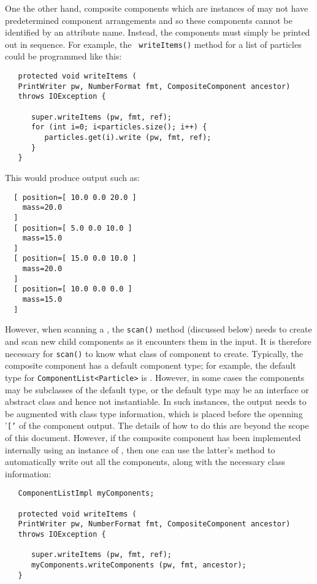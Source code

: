 \documentclass{article}
\begin{document}
One the other hand, composite components which are instances of
 may
not have predetermined component arrangements and so these components
cannot be identified by an attribute name. Instead, the components
must simply be printed out in sequence.  For example, the {\tt
writeItems()} method for a list of particles could be programmed like
this:
\begin{lstlisting}
   protected void writeItems (
   PrintWriter pw, NumberFormat fmt, CompositeComponent ancestor) 
   throws IOException {

      super.writeItems (pw, fmt, ref);
      for (int i=0; i<particles.size(); i++) {
         particles.get(i).write (pw, fmt, ref);
      }
   }   
\end{lstlisting}
This would produce output such as:
\begin{lstlisting}
  [ position=[ 10.0 0.0 20.0 ]
    mass=20.0
  ]
  [ position=[ 5.0 0.0 10.0 ]
    mass=15.0
  ]
  [ position=[ 15.0 0.0 10.0 ]
    mass=20.0
  ]
  [ position=[ 10.0 0.0 0.0 ]
    mass=15.0
  ]
\end{lstlisting}
However, when scanning a
, the
{\tt scan()} method (discussed below) needs to create and scan new
child components as it encounters them in the input.  It is therefore
necessary for {\tt scan()} to know what class of component to create.
Typically, the composite component has a default component
type; for example, the default type for {\tt ComponentList<Particle>}
is . However, in some
cases the components may be subclasses of the default type, or the
default type may be an interface or abstract class and hence not
instantiable. In such instances, the output needs to be augmented with
class type information, which is placed before the openning '{\tt ['}
of the component output.  The details of how to do
this are beyond the scope of this document. However,
if the composite component has been implemented internally using
an instance of 
,
then one can use the latter's
method to automatically write out all the components, along with the necessary
class information:
\begin{lstlisting}
   ComponentListImpl myComponents; 

   protected void writeItems (
   PrintWriter pw, NumberFormat fmt, CompositeComponent ancestor) 
   throws IOException {

      super.writeItems (pw, fmt, ref);
      myComponents.writeComponents (pw, fmt, ancestor);
   }
\end{lstlisting}
\end{document}
